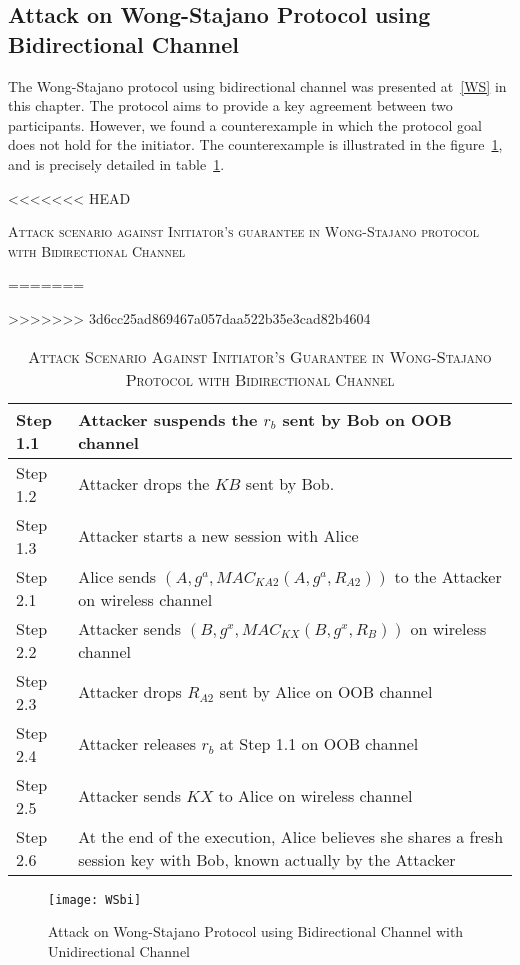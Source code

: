 \subsection{Attack on Wong-Stajano Protocol using Bidirectional Channel}

The Wong-Stajano protocol using bidirectional channel was presented at~\ref{WS} in this chapter. The protocol aims to provide a key agreement between two participants. However, we found a counterexample in which the protocol goal does not hold for the initiator. The counterexample is illustrated in the figure~\ref{WSbiattack}, and is precisely detailed in table~\ref{WSbiattacktable}. 

\begin{table}[t]
\centering
<<<<<<< HEAD
\caption{\textsc{Attack scenario against Initiator's guarantee in Wong-Stajano protocol with Bidirectional Channel}}
=======
\caption{\textsc{Attack Scenario Against Initiator's Guarantee in Wong-Stajano Protocol with Bidirectional Channel}}
>>>>>>> 3d6cc25ad869467a057daa522b35e3cad82b4604
\label{WSbiattacktable}
{\small
\begin{tabular}{| l | p{11cm} |}
 \hline
 Step 1.1 & Attacker suspends the $r_b$ sent by Bob on OOB channel\\ \hline
 Step 1.2 & Attacker drops the $KB$ sent by Bob. \\ \hline
 Step 1.3 & Attacker starts a new session with Alice\\ \hline \hline
 Step 2.1 & Alice sends $(A, g^{a}, MAC_{KA2}(A,g^{a},R_{A2}))$ to the Attacker on wireless channel\\ \hline
 Step 2.2 & Attacker sends $(B, g^{x}, MAC_{KX}(B,g^{x},R_{B}))$ on wireless channel\\ \hline
 Step 2.3 & Attacker drops $R_{A2}$ sent by Alice on OOB channel\\ \hline
 Step 2.4 & Attacker releases $r_b$ at Step 1.1 on OOB channel \\ \hline
 Step 2.5 & Attacker sends $KX$ to Alice on wireless channel\\ \hline
 Step 2.6 & At the end of the execution, Alice believes she shares a fresh session key with Bob, known actually by the Attacker\\ \hline
\end{tabular}
}
\end{table}

\begin{figure}
  \centering
  \texttt{[image: WSbi]}
  \caption{Attack on Wong-Stajano Protocol using Bidirectional Channel with Unidirectional Channel}
  \label{WSbiattack}
\end{figure}

